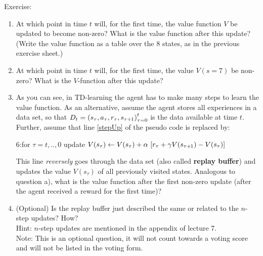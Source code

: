 Exercise:
\begin{enumerate}
\item At which point in time $t$ will, for the first time, the value function $V$ be updated to become non-zero? What is the value function after this update? (Write the value function as a table over the 8 states, as in the previous exercise sheet.)

\item At which point in time $t$ will, for the first time, the value $V(s=7)$ be non-zero? What is the $V$-function after this update?

\item As you can see, in TD-learning the agent has to make many steps to learn the value function. As an alternative, assume the agent stores all experiences in a data set, so that $D_t={(s_\tau,a_\tau,r_\tau,s_{\tau{{\hspace*{-.0pt}\text{\rm +}\hspace*{-.5pt}}1}})}_{\tau=0}^t$ is the data available at time $t$. Further, assume that line \ref{stepUp} of the pseudo code is replaced by:

6:\quad for $\tau=t,..,0$ update $V(s_\tau) \gets V(s_\tau) + \alpha~ [r_\tau + \gamma V(s_{\tau{{\hspace*{-.0pt}\text{\rm +}\hspace*{-.5pt}}1}}) - V(s_\tau)]$

This line \emph{reversely} goes through the data set (also called \textbf{replay buffer}) and updates the value $V(s_\tau)$ of all previously visited states. Analogous to question a), what is the value function after the first non-zero update (after the agent received a reward for the first time)?

\item (Optional) Is the replay buffer just described the same or related to the $n$-step updates? How? \\
	Hint: $n$-step updates are mentioned in the appendix of lecture 7. \\
	Note: This is an optional question, it will not count towards a voting score and will not be listed in the voting form.
\end{enumerate}

